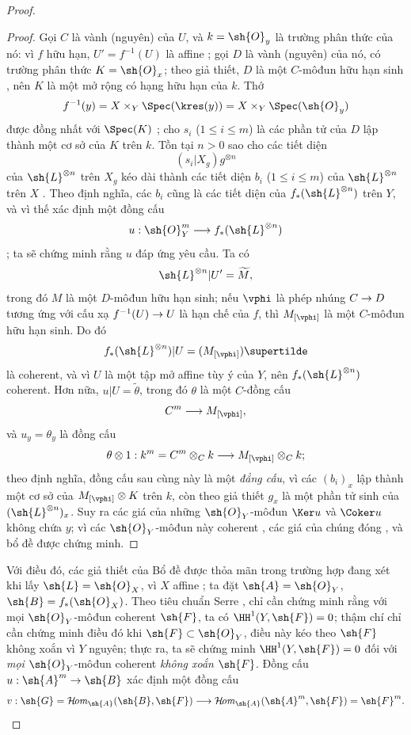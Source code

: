 \documentclass[oneside,10pt]{amsart}
\makeatletter
\renewcommand{\leq}{\leqslant}
\newcommand{\ega@arrow}[2]{\mathchoice{#1}{#2}{#2}{#2}}
\renewcommand{\to}{\ega@arrow{\longrightarrow}{\rightarrow}}
\def\shHom{\mathcal{H}\!\mathit{om}}
\makeatother
\begin{document}
\begin{proof}
\begin{proof}
Gọi $C$ là vành (nguyên) của $U$, và $k=\sh{O}_y$ là trường phân thức của nó:
vì $f$ hữu hạn, $U'=f^{-1}(U)$ là affine ;
gọi $D$ là vành (nguyên) của nó, có trường phân thức $K=\sh{O}_x$;
theo giả thiết, $D$ là một $C$-môđun hữu hạn sinh , nên $K$ là một mở rộng có hạng hữu hạn của $k$.
Thớ
\[
  f^{-1}(y)=X\times_Y\Spec(\kres(y))=X\times_Y\Spec(\sh{O}_y)
\]
được đồng nhất với $\Spec(K)$ ;
cho $s_i$ ($1\leq i\leq m$) là các phần tử của $D$ lập thành một cơ sở của $K$ trên $k$.
Tồn tại $n>0$ sao cho các tiết diện
\[
  (s_i|X_g)g^{\otimes n}
\]
của $\sh{L}^{\otimes n}$ trên $X_g$ kéo dài thành các tiết diện $b_i$ ($1\leq i\leq m$) của $\sh{L}^{\otimes n}$ trên $X$ .
Theo định nghĩa, các $b_i$ cũng là các tiết diện của $f_*(\sh{L}^{\otimes n})$ trên $Y$, và vì thế xác định một đồng cấu
\[
  u:\sh{O}_Y^m\to f_*(\sh{L}^{\otimes n})
\]
;
ta sẽ chứng minh rằng $u$ đáp ứng yêu cầu.
Ta có
\[
  \sh{L}^{\otimes n}|U'=\widetilde{M},
\]
trong đó $M$ là một $D$-môđun hữu hạn sinh;
nếu $\vphi$ là phép nhúng $C\to D$ tương ứng với cấu xạ $f^{-1}(U)\to U$ là hạn chế của $f$, thì $M_{[\vphi]}$ là một $C$-môđun hữu hạn sinh.
Do đó
\[
  f_*(\sh{L}^{\otimes n})|U=(M_{[\vphi]})\supertilde
\]
 là coherent, và vì $U$ là một tập mở affine tùy ý của $Y$, nên $f_*(\sh{L}^{\otimes n})$ coherent.
Hơn nữa, $u|U=\widetilde{\theta}$, trong đó $\theta$ là một $C$-đồng cấu
\[
  C^m\to M_{[\vphi]},
\]
và $u_y=\theta_y$ là đồng cấu
\[
  \theta\otimes1:k^m=C^m\otimes_Ck\to M_{[\vphi]}\otimes_Ck;
\]
theo định nghĩa, đồng cấu sau cùng này là một \emph{đẳng cấu}, vì các $(b_i)_x$ lập thành một cơ sở của $M_{[\vphi]}\otimes K$ trên $k$, còn theo giả thiết $g_x$ là một phần tử sinh của $(\sh{L}^{\otimes n})_x$.
Suy ra các giá của những $\sh{O}_Y$-môđun $\Ker u$ và $\Coker u$ không chứa $y$;
vì các $\sh{O}_Y$-môđun này coherent , các giá của chúng đóng , và bổ đề được chứng minh.
\end{proof}

Với điều đó, các giả thiết của Bổ đề  được thỏa mãn trong trường hợp đang xét khi lấy $\sh{L}=\sh{O}_X$, vì $X$ affine ;
ta đặt $\sh{A}=\sh{O}_Y$, $\sh{B}=f_*(\sh{O}_X)$.
Theo tiêu chuẩn Serre , chỉ cần chứng minh rằng với mọi $\sh{O}_Y$-môđun coherent $\sh{F}$, ta có $\HH^1(Y,\sh{F})=0$;
thậm chí chỉ cần chứng minh điều đó khi $\sh{F}\subset\sh{O}_Y$, điều này kéo theo $\sh{F}$ không xoắn vì $Y$ nguyên;
thực ra, ta sẽ chứng minh $\HH^1(Y,\sh{F})=0$ đối với \emph{mọi} $\sh{O}_Y$-môđun coherent \emph{không xoắn} $\sh{F}$.
Đồng cấu $u:\sh{A}^m\to\sh{B}$ xác định một đồng cấu
\[
  v:\sh{G}=\shHom_{\sh{A}}(\sh{B},\sh{F})
  \to
  \shHom_{\sh{A}}(\sh{A}^m,\sh{F})
  =\sh{F}^m.
\]


\end{proof}
\end{document}
